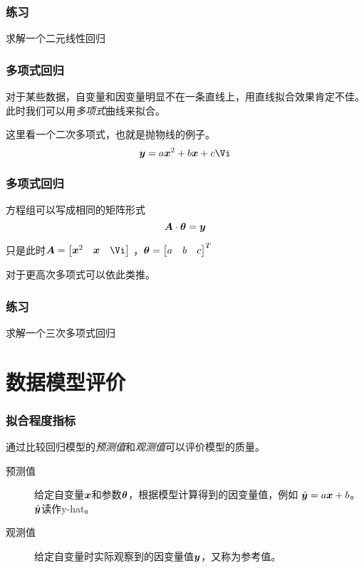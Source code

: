 \documentclass[14pt]{beamer}
\begin{document}
    \begin{frame}
        \frametitle{练习}
        求解一个二元线性回归
    \end{frame}

    \begin{frame}
        \frametitle{多项式回归}
        对于某些数据，自变量和因变量明显不在一条直线上，用直线拟合效果肯定不佳。
        此时我们可以用\emph{多项式}曲线来拟合。

        这里看一个二次多项式，也就是抛物线的例子。
        \begin{equation}
            \Vy = a\Vx^2+b\Vx+c\Vi
        \end{equation}
    \end{frame}

    \begin{frame}
        \frametitle{多项式回归}
        方程组可以写成相同的矩阵形式
        \begin{equation}
            \bm{A}\cdot\bm{\theta}=\bm{y}
        \end{equation}
        
        只是此时$\MA=\begin{bmatrix}
                \Vx^2 & \Vx & \Vi
            \end{bmatrix}$
            ，$\bm{\theta}=\begin{bmatrix}a&b&c\end{bmatrix}^T$

        对于更高次多项式可以依此类推。
    \end{frame}

    \begin{frame}
        \frametitle{练习}
        求解一个三次多项式回归
    \end{frame}

    \section{数据模型评价}

    \begin{frame}
        \frametitle{拟合程度指标}
        通过比较回归模型的\emph{预测值}和\emph{观测值}可以评价模型的质量。
        \begin{description}
            \item[预测值] 给定自变量$\bm{x}$和参数$\bm{\theta}$，根据模型计算得到的因变量值，例如
            $\hat{\bm{y}}=a\bm{x}+b$。 $\hat{\bm{y}}$读作y-hat。
            \item[观测值] 给定自变量时实际观察到的因变量值$\bm{y}$，又称为参考值。 
        \end{description}
    \end{frame}
\end{document}
